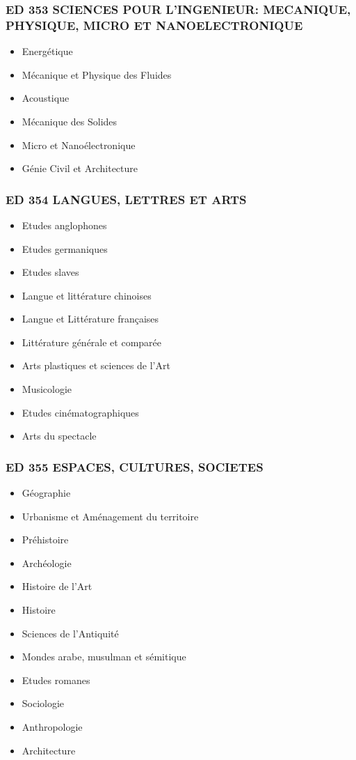 \subsubsection*{ED 353 SCIENCES POUR L'INGENIEUR: MECANIQUE, PHYSIQUE, MICRO ET NANOELECTRONIQUE}\label{ed-353-sciences-pour-lingenieur-mecanique-physique-micro-et-nanoelectronique}

\begin{itemize}
\item
  Energétique
\item
  Mécanique et Physique des Fluides
\item
  Acoustique
\item
  Mécanique des Solides
\item
  Micro et Nanoélectronique
\item
  Génie Civil et Architecture
\end{itemize}

\subsubsection*{ED 354 LANGUES, LETTRES ET ARTS}\label{ed-354-langues-lettres-et-arts}

\begin{itemize}
\item
  Etudes anglophones
\item
  Etudes germaniques
\item
  Etudes slaves
\item
  Langue et littérature chinoises
\item
  Langue et Littérature françaises
\item
  Littérature générale et comparée
\item
  Arts plastiques et sciences de l'Art
\item
  Musicologie
\item
  Etudes cinématographiques
\item
  Arts du spectacle
\end{itemize}

\subsubsection*{ED 355 ESPACES, CULTURES, SOCIETES}\label{ed-355-espaces-cultures-societes}

\begin{itemize}
\item
  Géographie
\item
  Urbanisme et Aménagement du territoire
\item
  Préhistoire
\item
  Archéologie
\item
  Histoire de l'Art
\item
  Histoire
\item
  Sciences de l'Antiquité
\item
  Mondes arabe, musulman et sémitique
\item
  Etudes romanes
\item
  Sociologie
\item
  Anthropologie
\item
  Architecture
\end{itemize}


